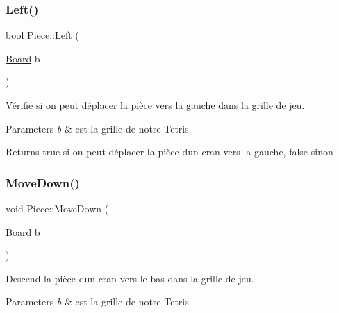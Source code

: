 \mbox{\label{classPiece_aaef48eb5277927bcacace16aaf2d9636}} 
\subsubsection{\texorpdfstring{Left()}{Left()}}
{\footnotesize\ttfamily bool Piece\+::\+Left (\begin{DoxyParamCaption}\item[{\hyperlink{classBoard}{Board}}]{b }\end{DoxyParamCaption})}



Vérifie si on peut déplacer la pièce vers la gauche dans la grille de jeu. 


\begin{DoxyParams}{Parameters}
{\em b} & est la grille de notre Tetris \\
\hline
\end{DoxyParams}
\begin{DoxyReturn}{Returns}
true si on peut déplacer la pièce d\textquotesingle{}un cran vers la gauche, false sinon 
\end{DoxyReturn}
\mbox{\label{classPiece_a44530e200e9506f7bb4668e82dd91d54}} 
\subsubsection{\texorpdfstring{Move\+Down()}{MoveDown()}}
{\footnotesize\ttfamily void Piece\+::\+Move\+Down (\begin{DoxyParamCaption}\item[{\hyperlink{classBoard}{Board}}]{b }\end{DoxyParamCaption})}



Descend la pièce d\textquotesingle{}un cran vers le bas dans la grille de jeu. 


\begin{DoxyParams}{Parameters}
{\em b} & est la grille de notre Tetris \\
\hline
\end{DoxyParams}
\mbox{\label{classPiece_a08f2bd761965092bd4f8f97c81aa6af8}} 

